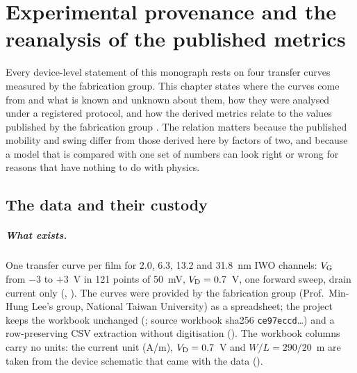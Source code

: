\chapter{Experimental provenance and the reanalysis of the published metrics}
\label{ch:mono-provenance}

Every device-level statement of this monograph rests on four transfer curves measured by the fabrication group. This
chapter states where the curves come from and what is known and unknown about them, how they were analysed under a
registered protocol, and how the derived metrics relate to the values published by the fabrication group
\citep{Januar2026}. The relation matters because the published mobility and swing differ from those derived here by
factors of two, and because a model that is compared with one set of numbers can look right or wrong for reasons that
have nothing to do with physics.

\section{The data and their custody}
\label{sec:mono-prov-data}

\paragraph{What exists.} One transfer curve per film for 2.0, 6.3, 13.2 and 31.8~nm IWO channels: $V_{\mathrm{G}}$ from $-3$ to
$+3$~V in 121 points of 50~mV, $V_{\mathrm{D}} = 0.7$~V, one forward sweep, drain current only (,
). The curves were provided by the fabrication group (Prof.\ Min-Hung Lee's group, National Taiwan
University) as a spreadsheet; the project keeps the workbook unchanged
(; source workbook sha256 \texttt{ce97eccd}\ldots) and a
row-preserving CSV extraction without digitisation (). The workbook columns carry no
units: the current unit (A/\textmu m), $V_{\mathrm{D}} = 0.7$~V and $W/L = 290/20$~\textmu m are taken from the device schematic
that came with the data ().

